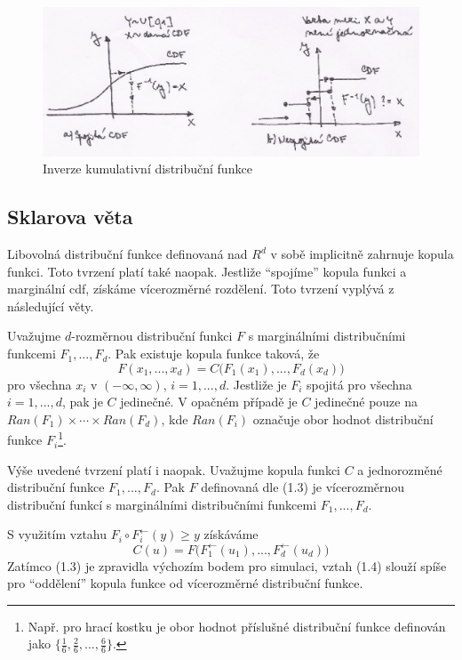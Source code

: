 \begin{figure}[htp]
\centering
\includegraphics[scale = 0.5]{pictures/inv_cdf.eps}
\caption{Inverze kumulativní distribuční funkce}
\label{inv_cdf}
\end{figure} 

\subsection{Sklarova věta}

Libovolná distribuční funkce definovaná nad $R^d$ v sobě implicitně zahrnuje kopula funkci. Toto tvrzení platí také naopak. Jestliže ``spojíme'' kopula funkci a marginální cdf, získáme vícerozměrné rozdělení. Toto tvrzení vyplývá z následující věty.

\begin{theorem}
Uvažujme $d$-rozměrnou distribuční funkci $F$ s marginálními distribučními funkcemi $F_1, ..., F_d$. Pak existuje kopula funkce taková, že
\begin{equation}
F(x_1, ..., x_d) = C\big(F_1(x_1), ..., F_d(x_d)\big)
\end{equation}
pro všechna $x_i$ v $(-\infty, \infty)$, $i = 1, ..., d$. Jestliže je $F_i$ spojitá pro všechna $i = 1, ..., d$, pak je $C$ jedinečné. V opačném případě je $C$ jedinečné pouze na $Ran(F_1) \times \cdots \times Ran(F_d)$, kde $Ran(F_i)$ označuje obor hodnot distribuční funkce $F_i$\footnote{Např. pro hrací kostku je obor hodnot příslušné distribuční funkce definován jako $\{\frac{1}{6}, \frac{2}{6}, ..., \frac{6}{6}\}$.}.

Výše uvedené tvrzení platí i naopak. Uvažujme kopula funkci $C$ a jednorozměné distribuční funkce $F_1, ..., F_d$. Pak $F$ definovaná dle (1.3) je vícerozměrnou distribuční funkcí s marginálními distribučními funkcemi $F_1, ..., F_d$.
\end{theorem}
S využitím vztahu $F_i \circ F_i^{\leftarrow}(y) \ge y$ získáváme
\begin{equation}
C(u) = F\big(F_1^{\leftarrow}(u_1), ..., F_d^{\leftarrow}(u_d)\big)
\end{equation}
Zatímco (1.3) je zpravidla výchozím bodem pro simulaci, vztah (1.4) slouží spíše pro ``oddělení'' kopula funkce od vícerozměrné distribuční funkce.

